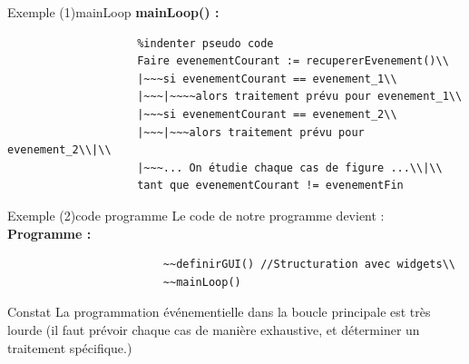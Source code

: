 \documentclass[12pt]{beamer}
\begin{document}
                \begin{frame}{Exemple (1)}{mainLoop}
                    \textbf{mainLoop() :}
                    \begin{verbatim}
                    %indenter pseudo code
                    Faire evenementCourant := recupererEvenement()\\
                    |~~~si evenementCourant == evenement_1\\
                    |~~~|~~~~alors traitement prévu pour evenement_1\\
                    |~~~si evenementCourant == evenement_2\\
                    |~~~|~~~alors traitement prévu pour evenement_2\\|\\
                    |~~~... On étudie chaque cas de figure ...\\|\\
                    tant que evenementCourant != evenementFin
                    \end{verbatim}
                \end{frame}
        
                \begin{frame}{Exemple (2)}{code programme}
                Le code de notre programme devient :\\ 
                \textbf{Programme :}
                    \begin{verbatim}
                        ~~definirGUI() //Structuration avec widgets\\
                        ~~mainLoop()
                    \end{verbatim}
                    \begin{block}{Constat}
                        La programmation événementielle dans la boucle principale est très lourde (il faut prévoir chaque cas de manière exhaustive, et déterminer un traitement spécifique.)
                    \end{block}
                \end{frame}
                
\end{document}
